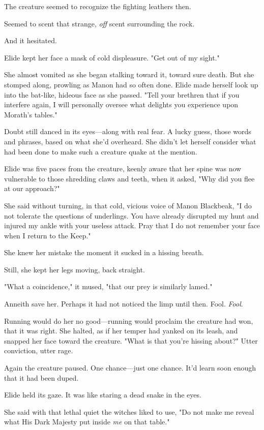 The creature seemed to recognize the fighting leathers then.

Seemed to scent that strange, \emph{off} scent surrounding the rock.

And it hesitated.

Elide kept her face a mask of cold displeasure.
"Get out of my sight."

She almost vomited as she began stalking toward it, toward sure death.
But she stomped along, prowling as Manon had so often done.
Elide made herself look up into the bat-like, hideous face as she passed.
"Tell your brethren that if you interfere again, I will personally oversee what delights you experience upon Morath's tables."

Doubt still danced in its eyes---along with real fear.
A lucky guess, those words and phrases, based on what she'd overheard.
She didn't let herself consider what had been done to make such a creature quake at the mention.

Elide was five paces from the creature, keenly aware that her spine was now vulnerable to those shredding claws and teeth, when it asked, "Why did you flee at our approach?"

She said without turning, in that cold, vicious voice of Manon Blackbeak, "I do not tolerate the questions of underlings.
You have already disrupted my hunt and injured my ankle with your useless attack.
Pray that I do not remember your face when I return to the Keep."

She knew her mistake the moment it sucked in a hissing breath.

Still, she kept her legs moving, back straight.

"What a coincidence," it mused, "that our prey is similarly lamed."

Anneith save her.
Perhaps it had not noticed the limp until then.
Fool.
\emph{Fool}.

Running would do her no good---running would proclaim the creature had won, that it was right.
She halted, as if her temper had yanked on its leash, and snapped her face toward the creature.
"What is that you're hissing about?"
Utter conviction, utter rage.

Again the creature paused.
One chance---just one chance.
It'd learn soon enough that it had been duped.

Elide held its gaze.
It was like staring a dead snake in the eyes.

She said with that lethal quiet the witches liked to use, "Do not make me reveal what His Dark Majesty put inside \emph{me} on that table."

